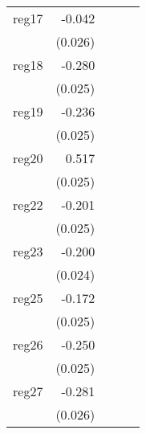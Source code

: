 {\begin{longtable}{l*{4}{D{.}{.}{-1}}}
\addlinespace
reg17       &      -0.042         &                     &                     &                     \\
            &     (0.026)         &                     &                     &                     \\
\addlinespace
reg18       &      -0.280\sym{***}&                     &                     &                     \\
            &     (0.025)         &                     &                     &                     \\
\addlinespace
reg19       &      -0.236\sym{***}&                     &                     &                     \\
            &     (0.025)         &                     &                     &                     \\
\addlinespace
reg20       &       0.517\sym{***}&                     &                     &                     \\
            &     (0.025)         &                     &                     &                     \\
\addlinespace
reg22       &      -0.201\sym{***}&                     &                     &                     \\
            &     (0.025)         &                     &                     &                     \\
\addlinespace
reg23       &      -0.200\sym{***}&                     &                     &                     \\
            &     (0.024)         &                     &                     &                     \\
\addlinespace
reg25       &      -0.172\sym{***}&                     &                     &                     \\
            &     (0.025)         &                     &                     &                     \\
\addlinespace
reg26       &      -0.250\sym{***}&                     &                     &                     \\
            &     (0.025)         &                     &                     &                     \\
\addlinespace
reg27       &      -0.281\sym{***}&                     &                     &                     \\
            &     (0.026)         &                     &                     &                     \\

\end{longtable}}

